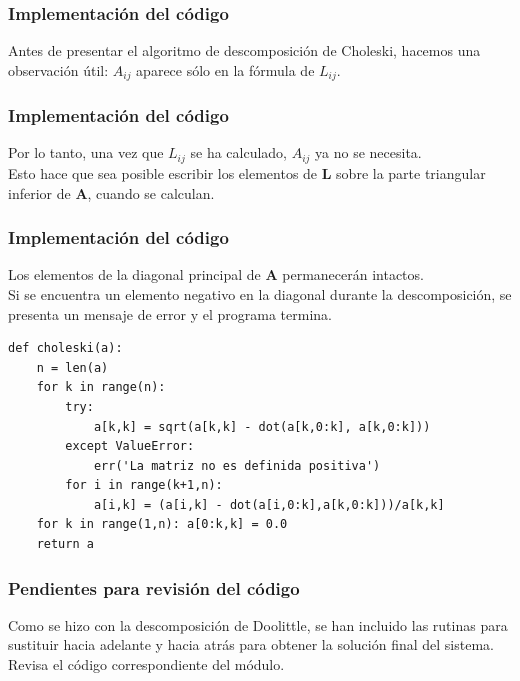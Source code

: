 \documentclass[12pt]{beamer}
\begin{document}
\begin{frame}
\frametitle{Implementación del código}
Antes de presentar el algoritmo de descomposición de Choleski, hacemos una observación útil: $A_{ij}$ aparece sólo en la fórmula de $L_{ij}$.
\end{frame}
\begin{frame}
\frametitle{Implementación del código}
Por lo tanto, una vez que $L_{ij}$ se ha calculado, $A_{ij}$ ya no se necesita.
\\
\bigskip
\pause
Esto hace que sea posible escribir los elementos de $\mathbf{L}$ sobre la parte triangular inferior de $\mathbf{A}$, cuando se calculan. 
\end{frame}
\begin{frame}
\frametitle{Implementación del código}
Los elementos de la diagonal principal de $\mathbf{A}$ permanecerán intactos. 
\\
\bigskip
\pause
Si se encuentra un elemento  negativo en la diagonal durante la descomposición, se presenta un mensaje de error y el programa termina.
\end{frame}
\begin{frame}
\begin{lstlisting}[caption=Algoritmo para la factorización con Choleski]
def choleski(a):
    n = len(a)
    for k in range(n):
        try:
            a[k,k] = sqrt(a[k,k] - dot(a[k,0:k], a[k,0:k]))
        except ValueError:
            err('La matriz no es definida positiva')
        for i in range(k+1,n):
            a[i,k] = (a[i,k] - dot(a[i,0:k],a[k,0:k]))/a[k,k]
    for k in range(1,n): a[0:k,k] = 0.0
    return a
\end{lstlisting}
\end{frame}
\begin{frame}
\frametitle{Pendientes para revisión del código}
Como se hizo con la descomposición de Doolittle, se han incluido las rutinas para sustituir hacia adelante y hacia atrás para obtener la solución final del sistema.
\\
\bigskip
\pause
Revisa el código correspondiente del módulo.
\end{frame}

\end{document}
